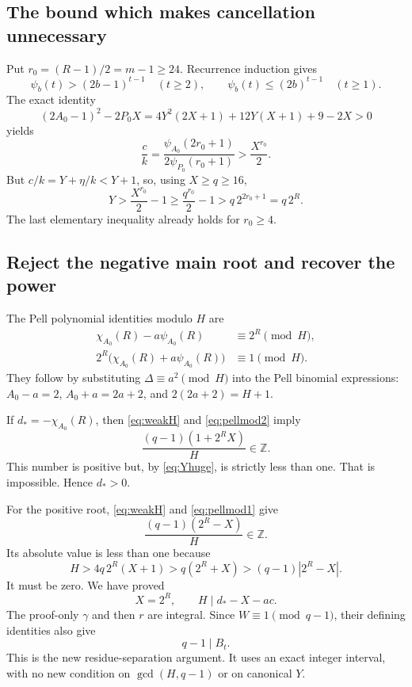 \documentclass[11pt]{article}
\theoremstyle{remark}
\newcommand{\Z}{\mathbb Z}
\begin{document}
\subsection{The bound which makes cancellation unnecessary}
Put $r_0=(R-1)/2=m-1\ge24$. Recurrence induction gives
\[
 \psi_b(t)>(2b-1)^{t-1}\quad(t\ge2),\qquad
 \psi_b(t)\le(2b)^{t-1}\quad(t\ge1).
\]
The exact identity
\[
 (2A_0-1)^2-2P_0X
 =4Y^2(2X+1)+12Y(X+1)+9-2X>0
\]
yields
\[
 \frac ck=\frac{\psi_{A_0}(2r_0+1)}{2\psi_{P_0}(r_0+1)}
 >\frac{X^{r_0}}2.
\]
But $c/k=Y+\eta/k<Y+1$, so, using $X\ge q\ge16$,
\begin{equation}\label{eq:Yhuge}
 Y>\frac{X^{r_0}}2-1\ge\frac{q^{r_0}}2-1
 >q\,2^{2r_0+1}=q\,2^R.
\end{equation}
The last elementary inequality already holds for $r_0\ge4$.

\subsection{Reject the negative main root and recover the power}
The Pell polynomial identities modulo $H$ are
\begin{align}
 \chi_{A_0}(R)-a\psi_{A_0}(R)&\equiv2^R\pmod H,\label{eq:pellmod1}\\
 2^R\bigl(\chi_{A_0}(R)+a\psi_{A_0}(R)\bigr)&\equiv1\pmod H.
 \label{eq:pellmod2}
\end{align}
They follow by substituting $\Delta\equiv a^2\pmod H$ into the Pell
binomial expressions: $A_0-a=2$, $A_0+a=2a+2$, and
$2(2a+2)=H+1$.

If $d_*=-\chi_{A_0}(R)$, then \eqref{eq:weakH} and
\eqref{eq:pellmod2} imply
\[
 \frac{(q-1)(1+2^RX)}H\in\Z.
\]
This number is positive but, by \eqref{eq:Yhuge}, is strictly less than
one. That is impossible. Hence $d_*>0$.

For the positive root, \eqref{eq:weakH} and \eqref{eq:pellmod1} give
\[
 \frac{(q-1)(2^R-X)}H\in\Z.
\]
Its absolute value is less than one because
\[
 H>4q\,2^R(X+1)>q(2^R+X)>(q-1)|2^R-X|.
\]
It must be zero. We have proved
\begin{equation}\label{eq:exactpower}
 X=2^R,\qquad H\mid d_*-X-ac.
\end{equation}
The proof-only $\gamma$ and then $r$ are integral. Since
$W\equiv1\pmod{q-1}$, their defining identities also give
\begin{equation}\label{eq:transportdiv}
 q-1\mid B_t.
\end{equation}
This is the new residue-separation argument. It uses an exact integer
interval, with no new condition on $\gcd(H,q-1)$ or on canonical $Y$.
\end{document}
